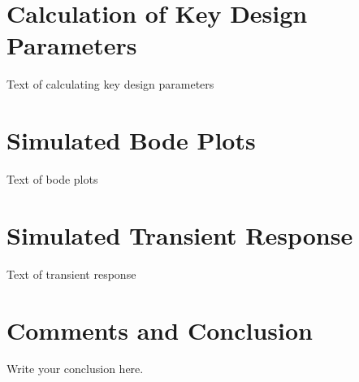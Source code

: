 \documentclass[12pt,english]{article}
\begin{document}
\section{Calculation of Key Design Parameters}
Text of calculating key design parameters

\pagebreak



\section{Simulated Bode Plots}
Text of bode plots

\pagebreak



\section{Simulated Transient Response}
Text of transient response

\pagebreak



\section{Comments and Conclusion}
Write your conclusion here.

\pagebreak

\end{document}
